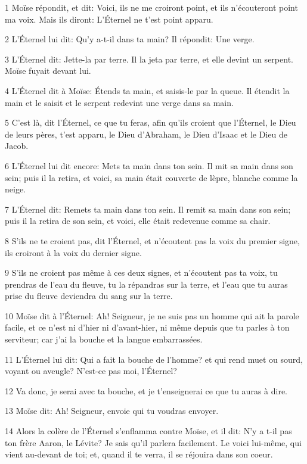\par 1 Moïse répondit, et dit: Voici, ils ne me croiront point, et ils n'écouteront point ma voix. Mais ils diront: L'Éternel ne t'est point apparu.
\par 2 L'Éternel lui dit: Qu'y a-t-il dans ta main? Il répondit: Une verge.
\par 3 L'Éternel dit: Jette-la par terre. Il la jeta par terre, et elle devint un serpent. Moïse fuyait devant lui.
\par 4 L'Éternel dit à Moïse: Étends ta main, et saisis-le par la queue. Il étendit la main et le saisit et le serpent redevint une verge dans sa main.
\par 5 C'est là, dit l'Éternel, ce que tu feras, afin qu'ils croient que l'Éternel, le Dieu de leurs pères, t'est apparu, le Dieu d'Abraham, le Dieu d'Isaac et le Dieu de Jacob.
\par 6 L'Éternel lui dit encore: Mets ta main dans ton sein. Il mit sa main dans son sein; puis il la retira, et voici, sa main était couverte de lèpre, blanche comme la neige.
\par 7 L'Éternel dit: Remets ta main dans ton sein. Il remit sa main dans son sein; puis il la retira de son sein, et voici, elle était redevenue comme sa chair.
\par 8 S'ils ne te croient pas, dit l'Éternel, et n'écoutent pas la voix du premier signe, ils croiront à la voix du dernier signe.
\par 9 S'ils ne croient pas même à ces deux signes, et n'écoutent pas ta voix, tu prendras de l'eau du fleuve, tu la répandras sur la terre, et l'eau que tu auras prise du fleuve deviendra du sang sur la terre.
\par 10 Moïse dit à l'Éternel: Ah! Seigneur, je ne suis pas un homme qui ait la parole facile, et ce n'est ni d'hier ni d'avant-hier, ni même depuis que tu parles à ton serviteur; car j'ai la bouche et la langue embarrassées.
\par 11 L'Éternel lui dit: Qui a fait la bouche de l'homme? et qui rend muet ou sourd, voyant ou aveugle? N'est-ce pas moi, l'Éternel?
\par 12 Va donc, je serai avec ta bouche, et je t'enseignerai ce que tu auras à dire.
\par 13 Moïse dit: Ah! Seigneur, envoie qui tu voudras envoyer.
\par 14 Alors la colère de l'Éternel s'enflamma contre Moïse, et il dit: N'y a t-il pas ton frère Aaron, le Lévite? Je sais qu'il parlera facilement. Le voici lui-même, qui vient au-devant de toi; et, quand il te verra, il se réjouira dans son coeur.
